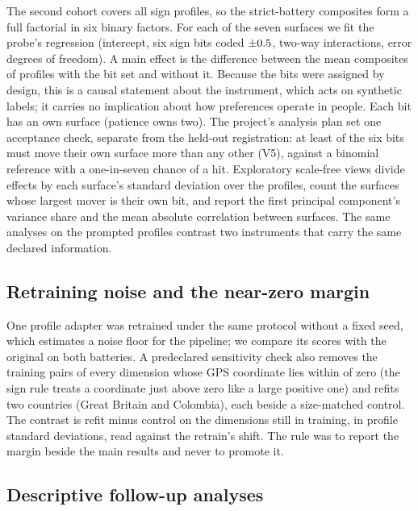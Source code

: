 The second cohort covers all  sign profiles, so the strict-battery composites form a full factorial in six binary factors. For each of the seven surfaces we fit the probe's regression (intercept, six sign bits coded $\pm\dc{0.5}{x_code}$,  two-way interactions,  error degrees of freedom). A main effect is the difference between the mean composites of profiles with the bit set and without it. Because the bits were assigned by design, this is a causal statement about the instrument, which acts on synthetic labels; it carries no implication about how preferences operate in people. Each bit has an own surface (patience owns two). The project's analysis plan set one acceptance check, separate from the held-out registration: at least  of the six bits must move their own surface more than any other (V5), against a binomial reference with a one-in-seven chance of a hit. Exploratory scale-free views divide effects by each surface's standard deviation over the  profiles, count the surfaces whose largest mover is their own bit, and report the first principal component's variance share and the mean absolute correlation between surfaces. The same analyses on the  prompted profiles contrast two instruments that carry the same declared information.

\subsection{Retraining noise and the near-zero margin}\label{sec:design-noise}

One profile adapter was retrained under the same protocol without a fixed seed, which estimates a noise floor for the pipeline; we compare its scores with the original on both batteries. A predeclared sensitivity check also removes the training pairs of every dimension whose GPS coordinate lies within  of zero (the sign rule treats a coordinate just above zero like a large positive one) and refits two countries (Great Britain and Colombia), each beside a size-matched control. The contrast is refit minus control on the dimensions still in training, in profile standard deviations, read against the retrain's shift. The rule was to report the margin beside the main results and never to promote it.

\subsection{Descriptive follow-up analyses}\label{sec:design-desc}

